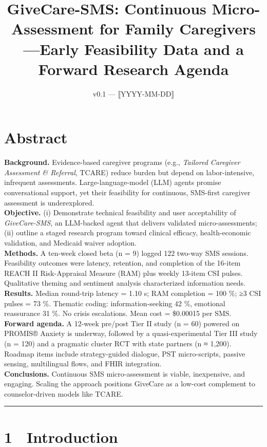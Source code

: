 \documentclass[
]{article}
\title{GiveCare-SMS: Continuous Micro-Assessment for Family
Caregivers---Early Feasibility Data and a Forward Research Agenda}
\author{}
\date{v0.1 --- ⟦YYYY-MM-DD⟧}
\begin{document}
\maketitle

\section{Abstract}\label{abstract}

\textbf{Background.} Evidence-based caregiver programs (e.g.,
\emph{Tailored Caregiver Assessment \& Referral}, TCARE) reduce burden
but depend on labor-intensive, infrequent assessments.
Large-language-model (LLM) agents promise conversational support, yet
their feasibility for continuous, SMS-first caregiver assessment is
underexplored.\\
\textbf{Objective.} (i) Demonstrate technical feasibility and user
acceptability of \emph{GiveCare-SMS}, an LLM-backed agent that delivers
validated micro-assessments; (ii) outline a staged research program
toward clinical efficacy, health-economic validation, and Medicaid
waiver adoption.\\
\textbf{Methods.} A ten-week closed beta (n = 9) logged 122 two-way SMS
sessions. Feasibility outcomes were latency, retention, and completion
of the 16-item REACH II Risk-Appraisal Measure (RAM) plus weekly 13-item
CSI pulses. Qualitative theming and sentiment analysis characterized
information needs.\\
\textbf{Results.} Median round-trip latency = 1.10 s; RAM completion =
100 \%; ≥3 CSI pulses = 73 \%. Thematic coding: information-seeking 42
\%, emotional reassurance 31 \%. No crisis escalations. Mean cost =
\$0.00015 per SMS.\\
\textbf{Forward agenda.} A 12-week pre/post Tier II study (n = 60)
powered on PROMIS® Anxiety is underway, followed by a quasi-experimental
Tier III study (n = 120) and a pragmatic cluster RCT with state partners
(n ≈ 1,200). Roadmap items include strategy-guided dialogue, PST
micro-scripts, passive sensing, multilingual flows, and FHIR
integration.\\
\textbf{Conclusions.} Continuous SMS micro-assessment is viable,
inexpensive, and engaging. Scaling the approach positions GiveCare as a
low-cost complement to counselor-driven models like TCARE.

\begin{center}\rule{0.5\linewidth}{0.5pt}\end{center}

\section{1 Introduction}\label{introduction}
\end{document}
